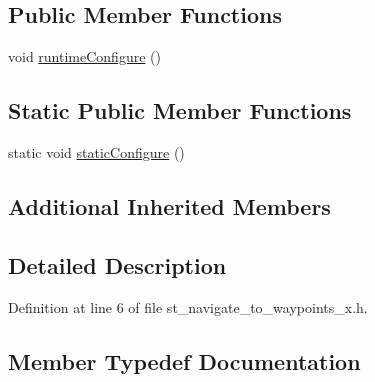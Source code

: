\subsection*{Public Member Functions}
\begin{DoxyCompactItemize}
\item 
void \hyperlink{structsm__dance__bot__3_1_1StNavigateToWaypointsX_a7416ea39fce6a3b577d47448575fa0f6}{runtime\+Configure} ()
\end{DoxyCompactItemize}
\subsection*{Static Public Member Functions}
\begin{DoxyCompactItemize}
\item 
static void \hyperlink{structsm__dance__bot__3_1_1StNavigateToWaypointsX_a141197b232cd59846486861ebadd147e}{static\+Configure} ()
\end{DoxyCompactItemize}
\subsection*{Additional Inherited Members}


\subsection{Detailed Description}


Definition at line 6 of file st\+\_\+navigate\+\_\+to\+\_\+waypoints\+\_\+x.\+h.



\subsection{Member Typedef Documentation}

